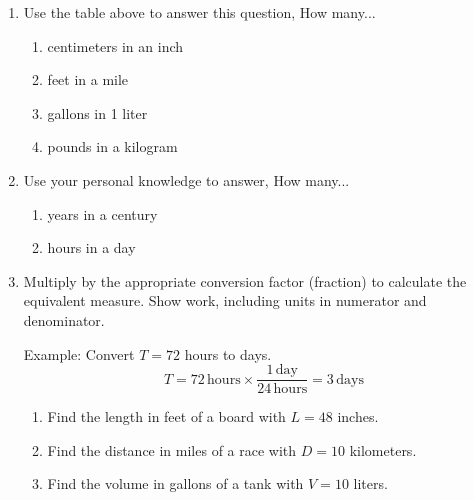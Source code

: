 \begin{enumerate}

\item Use the table above to answer this question, How many...
  \begin{multicols}{2}
    \begin{enumerate}[itemsep=1cm]
      \item centimeters in an inch
      \item feet in a mile
      \item gallons in 1 liter
      \item pounds in a kilogram
    \end{enumerate}
  \end{multicols}

\item Use your personal knowledge to answer, How many...
  \begin{multicols}{2}
    \begin{enumerate}[itemsep=1cm]
      \item years in a century
      \item hours in a day
    \end{enumerate}
  \end{multicols}

\item Multiply by the appropriate conversion factor (fraction) to calculate the equivalent measure. Show work, including units in numerator and denominator. \par \smallskip
  Example: Convert $T=72$ hours to days.
  $$T = 72 \,\mathrm{hours} \times \displaystyle \frac{1 \,\mathrm{day}}{24 \,\mathrm{hours}} = 3 \,\mathrm{days}$$  \medskip
  \begin{enumerate}[itemsep=2cm]
    \item Find the length in feet of a board with $L= 48$ inches.
    \item Find the distance in miles of a race with $D= 10$ kilometers.
    \item Find the volume in gallons of a tank with $V=10$ liters.
  \end{enumerate}


\end{enumerate}
